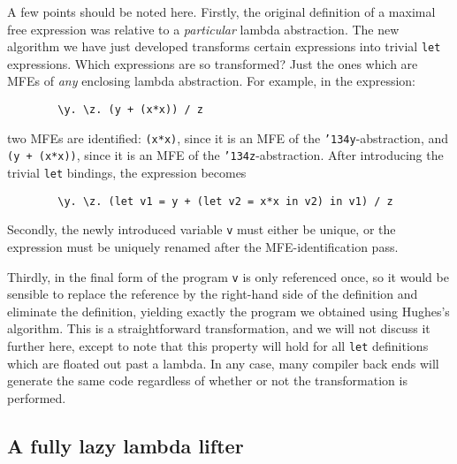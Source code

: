 A few points should be noted here.
Firstly, the original definition of a maximal free expression
was relative to a {\em particular\/} lambda abstraction.
The new algorithm we have just developed transforms certain expressions
into trivial \mbox{\tt let} expressions.
Which expressions are so transformed?  Just the ones which are MFEs of
{\em any\/} enclosing lambda abstraction.  For example, in the expression:
\begin{verbatim}
        \y. \z. (y + (x*x)) / z
\end{verbatim}
two MFEs are identified: \mbox{\tt (x*x)}, since it is an MFE of the \mbox{\tt {\char'134}y}-abstraction,
and \mbox{\tt (y\ +\ (x*x))}, since it is an MFE of the \mbox{\tt {\char'134}z}-abstraction.
After introducing the trivial \mbox{\tt let} bindings, the expression becomes
\begin{verbatim}
        \y. \z. (let v1 = y + (let v2 = x*x in v2) in v1) / z
\end{verbatim}

Secondly, the
newly introduced variable \mbox{\tt v} must either be unique, or the expression
must be uniquely renamed after the MFE-identification pass.

Thirdly, in the final form of the program \mbox{\tt v} is only referenced once,
so it would be sensible to replace the reference by the right-hand side
of the definition and eliminate the definition, yielding exactly the
program we obtained using Hughes's algorithm.  This is a straightforward
transformation, and we will not discuss it further here, except to note that
this property will hold
for all \mbox{\tt let} definitions which are floated out past a lambda.
In any case, many compiler back ends will generate the same code
regardless of whether or not the transformation is performed.

\subsection{A fully lazy lambda lifter}

